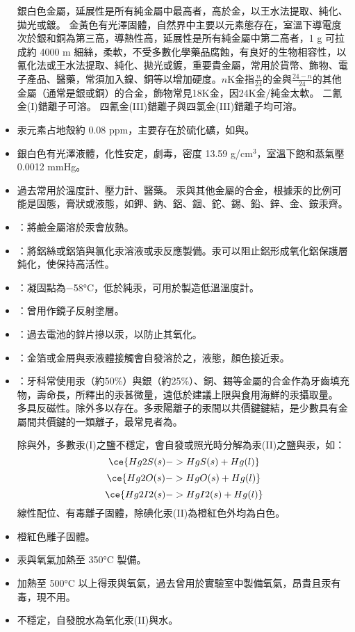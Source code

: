 \documentclass[a4paper,12pt]{report}
\begin{document}
\begin{itemize}
銀白色金屬，延展性是所有純金屬中最高者，高於金，以王水法提取、純化、拋光或鍍。
金黃色有光澤固體，自然界中主要以元素態存在，室溫下導電度次於銀和銅為第三高，導熱性高，延展性是所有純金屬中第二高者，1 g 可拉成約 4000 m 細絲，柔軟，不受多數化學藥品腐蝕，有良好的生物相容性，以氰化法或王水法提取、純化、拋光或鍍，重要貴金屬，常用於貨幣、飾物、電子產品、醫藥，常須加入鎳、銅等以增加硬度。$n$K金指$\frac{n}{24}$的金與$\frac{24-n}{24}$的其他金屬（通常是銀或銅）的合金，飾物常見18K金，因24K金/純金太軟。
二氰金(I)錯離子可溶。
四氰金(III)錯離子與四氯金(III)錯離子均可溶。
\bit
\item 汞元素占地殼約 0.08 ppm，主要存在於硫化礦，如與。
\item 銀白色有光澤液體，化性安定，劇毒，密度 13.59 g/cm$^3$，室溫下飽和蒸氣壓 0.0012 mmHg。
\item 過去常用於溫度計、壓力計、醫藥。
\eit
{}
汞與其他金屬的合金，根據汞的比例可能是固態，膏狀或液態，如鉀、鈉、鋁、銦、鉈、錫、鉛、鋅、金、銨汞齊。
\bit
\item {}：將鹼金屬溶於汞會放熱。
\item {}：將鋁絲或鋁箔與氯化汞溶液或汞反應製備。汞可以阻止鋁形成氧化鋁保護層鈍化，使保持高活性。
\item {}：凝固點為−58°C，低於純汞，可用於製造低溫溫度計。
\item {}：曾用作鏡子反射塗層。
\item {}：過去電池的鋅片摻以汞，以防止其氧化。
\item {}：金箔或金屑與汞液體接觸會自發溶於之，液態，顏色接近汞。
\item {}：牙科常使用汞（約50\%）與銀（約25\%）、銅、錫等金屬的合金作為牙齒填充物，壽命長，所釋出的汞甚微量，遠低於建議上限與食用海鮮的汞攝取量。
\eit
{}
多具反磁性。除外多以存在。多汞陽離子的汞間以共價鍵鍵結，是少數具有金屬間共價鍵的一類離子，最常見者為。

除與外，多數汞(I)之鹽不穩定，會自發或照光時分解為汞(II)之鹽與汞，如：
\[\ce{Hg2S(s) -> HgS(s) + Hg(l)}\]
\[\ce{Hg2O(s) -> HgO(s) + Hg(l)}\]
\[\ce{Hg2I2(s) -> HgI2(s) + Hg(l)}\]
線性配位、有毒離子固體，除碘化汞(II)為橙紅色外均為白色。
\bit
\item 橙紅色離子固體。
\item 汞與氧氣加熱至 350°C 製備。
\item 加熱至 500°C 以上得汞與氧氣，過去曾用於實驗室中製備氧氣，昂貴且汞有毒，現不用。
\item {}不穩定，自發脫水為氧化汞(II)與水。
\eit



\end{itemize}
\end{document}
